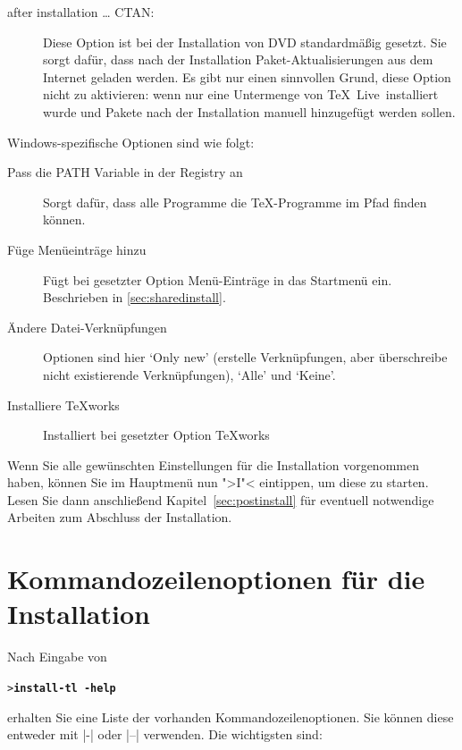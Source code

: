 \documentclass[12pt,ngerman,a4paper,fullparskip]{report}
\newcommand{\TL}{\TeX\ Live\xspace}
\newcommand{\Ucom}[1]{\textbf{\texttt{#1}}}
\begin{document}
\begin{description}
\item[after installation \dots{} CTAN:] Diese Option ist bei der Installation von DVD standardmäßig gesetzt. Sie sorgt dafür, dass nach der Installation Paket-Ak\-tuali\-sie\-rungen aus dem Internet geladen werden. Es gibt nur einen sinnvollen Grund, diese Option nicht zu aktivieren: wenn nur eine Untermenge von \TL\ installiert wurde und Pakete nach der Installation manuell hinzugefügt werden sollen.
\end{description}

Windows-spezifische Optionen sind wie folgt: 

\begin{description}
\item[Pass die PATH Variable in der Registry an] Sorgt dafür, dass alle Programme die \TeX-Programme im Pfad finden können.

\item[Füge Menüeinträge hinzu] Fügt bei gesetzter Option Menü-Einträge in das Startmenü ein.
Beschrieben in \ref{sec:sharedinstall}.

\item[Ändere Datei-Verknüpfungen] Optionen sind hier `Only new' (erstelle Verknüpfungen, aber überschreibe nicht existierende Verknüpfungen), `Alle' und `Keine'.

\item[Installiere \TeX{}works] Installiert bei gesetzter Option \TeX works
\end{description}

\noindent Wenn Sie alle gewünschten Einstellungen für die Installation vorgenommen haben, können Sie im Hauptmenü nun ">I"< eintippen, um diese zu starten. Lesen Sie dann anschließend Kapitel~\ref{sec:postinstall} für
eventuell notwendige Arbeiten zum Abschluss der Installation.

\section{Kommandozeilenoptionen für die Installation}\label{sec:cmdline}


Nach Eingabe von
\begin{alltt}
> \Ucom{install-tl -help}
\end{alltt}
erhalten Sie eine Liste der vorhanden Kommando\-zeilen\-optionen.  Sie können diese entweder mit |-| oder |--|
verwenden. Die wichtigsten sind:
\end{document}
